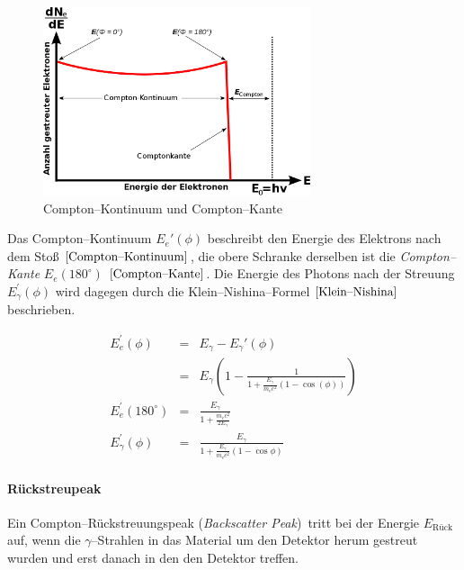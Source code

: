 \documentclass[12pt,a4paper]{scrartcl}
\numberwithin{equation}{section} %
\begin{document}
\begin{figure}[h]
	\centering
	\includegraphics[width=0.7\textwidth]{../media/B3.4/Comptonspektrum.jpg}
	\caption{Compton--Kontinuum und Compton--Kante \cite{abb:Compton}}
	\label{abb:Compton-Kante}
\end{figure}

Das Compton--Kontinuum $E_e'(\phi)$ beschreibt den Energie des Elektrons nach dem Stoß $\eqref{Compton--Kontinuum}$, die obere Schranke derselben ist die \emph{Compton--Kante} $E_e(180^\circ)$ $\eqref{Compton--Kante}$. Die Energie des Photons nach der Streuung $E_{\gamma}^\prime(\phi)$ wird dagegen durch die Klein--Nishina--Formel $\eqref{Klein--Nishina}$ beschrieben.

\begin{eqnarray}
    E_e^\prime(\phi)
        &=& E_{\gamma} - E_{\gamma}'(\phi) \\
        &=& E_{\gamma}
            \left(
                1-
                \frac{1}{1+\frac{E_{\gamma}}{m_\mathrm ec^2}
                    (1-\cos(\phi))}
            \right) \label{Compton--Kontinuum} \\
    E_e^\prime(180^\circ) &=& \frac{E_\gamma}{1+\frac{m_ec^2}{2E_\gamma}}
        \label{Compton--Kante} \\
    E_{\gamma}^\prime(\phi)
        &=& \frac{E_{\gamma}}{1+\frac{E_{\gamma}}{m_\mathrm ec^2}
            (1-\cos\phi)} \label{Klein--Nishina}
\end{eqnarray}

\paragraph{Rückstreupeak}

Ein Compton--Rückstreuungspeak (\emph{Backscatter Peak})~tritt bei der Energie $E_\mathrm{Rück}$ auf, wenn die $\gamma$--Strahlen in das Material um den Detektor herum gestreut wurden und erst danach in den
den Detektor treffen. \cite{Bethge}
\end{document}
